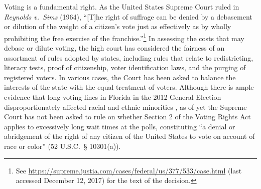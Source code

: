 \documentclass[12pt,titlepage]{article}
\begin{document}
Voting is a fundamental right. As the United States Supreme Court
ruled in \emph{Reynolds v.\ Sims} (1964), ``[T]he right of suffrage
can be denied by a debasement or dilution of the weight of a citizen's
vote just as effectively as by wholly prohibiting the free exercise of
the franchise.''\footnote{See
  \url{https://supreme.justia.com/cases/federal/us/377/533/case.html}
  (last accessed December 12, 2017) for the text of the decision.}  In
assessing the costs that may debase or dilute voting, the high court
has considered the fairness of an assortment of rules adopted by
states, including rules that relate to redistricting, literacy tests,
proof of citizenship, voter identification laws, and the purging of
registered voters. In various cases, the Court has been asked to
balance the interests of the state with the equal treatment of
voters. Although there is ample evidence that long voting lines in
Florida in the 2012 General Election disproportionately affected
racial and ethnic minorities \citep{herron_smith2014}, as of yet the
Supreme Court has not been asked to rule on whether Section 2 of the
Voting Rights Act applies to excessively long wait times at the polls,
constituting ``a denial or abridgement of the right of any citizen of
the United States to vote on account of race or color'' (52 U.S.C.\ \S
10301(a)).
\end{document}
